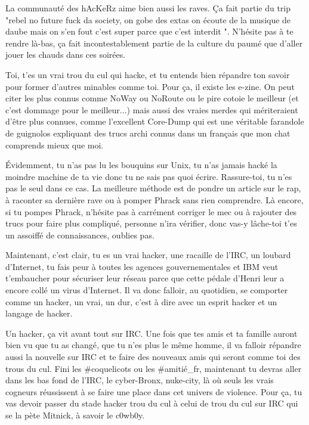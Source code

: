 	La communauté des hAcKeRz aime bien aussi les raves. Ça fait partie du trip "rebel no future fuck da society, on gobe des extas on écoute de la musique de daube mais on s'en fout c'est super parce que c'est interdit ". N'hésite pas à te rendre là-bas, ça fait incontestablement partie de la culture du paumé que d'aller jouer les chauds dans ces soirées.
	
	Toi, t'es un vrai trou du cul qui hacke, et tu entends bien répandre ton savoir pour former d'autres minables comme toi. Pour ça, il existe les e-zine. On peut citer les plus connus comme NoWay ou NoRoute ou le pire cotoie le meilleur (et c'est dommage pour le meilleur...) mais aussi des vraies merdes qui mériteraient d'être plus connues, comme l'excellent Core-Dump qui est une véritable farandole de guignolos expliquant des trucs archi connus dans un français que mon chat comprends mieux que moi.
	
	Évidemment, tu n'as pas lu les bouquins sur Unix, tu n'as jamais hacké la moindre machine de ta vie donc tu ne sais pas quoi écrire. Rassure-toi, tu n'es pas le seul dans ce cas. La meilleure méthode est de pondre un article sur le rap, à raconter sa dernière rave ou à pomper Phrack sans rien comprendre. Là encore, si tu pompes Phrack, n'hésite pas à carrément corriger le mec ou à rajouter des trucs pour faire plus compliqué, personne n'ira vérifier, donc vas-y lâche-toi t'es un assoiffé de connaissances, oublies pas.
	
	Maintenant, c'est clair, tu es un vrai hacker, une racaille de l'IRC, un loubard d'Internet, tu fais peur à toutes les agences gouvernementales et IBM veut t'embaucher pour sécuriser leur réseau parce que cette pédale d'Henri leur a encore collé un virus d'Internet. Il va donc falloir, au quotidien, se comporter comme un hacker, un vrai, un dur, c'est à dire avec un esprit hacker et un langage de hacker.
	
	Un hacker, ça vit avant tout sur IRC. Une fois que tes amis et ta famille auront bien vu que tu as changé, que tu n'es plus le même homme, il va falloir répandre aussi la nouvelle sur IRC et te faire des nouveaux amis qui seront comme toi des trous du cul. Fini les \#coquelicots ou les \#amitié\_fr, maintenant tu devras aller dans les bas fond de l'IRC, le cyber-Bronx, nuke-city, là où seuls les vrais cogneurs réussissent à se faire une place dans cet univers de violence. Pour ça, tu vas devoir passer du stade hacker trou du cul à celui de trou du cul sur IRC qui se la pète Mitnick, à savoir le c0wb0y.

